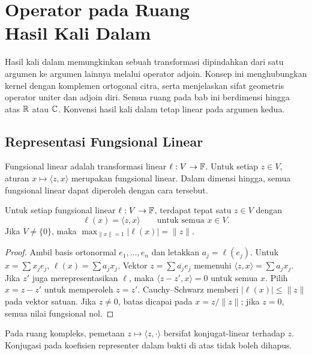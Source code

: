 \chapter[Operator pada Ruang Hasil Kali Dalam]{Operator pada Ruang\\Hasil Kali Dalam}
\label{ch:operator-hkd}

Hasil kali dalam memungkinkan sebuah transformasi dipindahkan
dari satu argumen ke argumen lainnya melalui operator adjoin.
Konsep ini menghubungkan kernel dengan komplemen ortogonal citra,
serta menjelaskan sifat geometris operator uniter dan adjoin diri.
Semua ruang pada bab ini berdimensi hingga atas $\mathbb{R}$ atau $\mathbb{C}$.
Konvensi hasil kali dalam tetap linear pada argumen kedua.

\section{Representasi Fungsional Linear}

Fungsional linear adalah transformasi linear $\ell:V\to\mathbb{F}$.
Untuk setiap $z\in V$, aturan $x\mapsto\langle z,x\rangle$
merupakan fungsional linear. Dalam dimensi hingga, semua
fungsional linear dapat diperoleh dengan cara tersebut.

\begin{teorema}
    Untuk setiap fungsional linear $\ell:V\to\mathbb{F}$, terdapat
    tepat satu $z\in V$ dengan
    \[
        \ell(x)=\langle z,x\rangle\qquad\text{untuk semua }x\in V.
    \]
    Jika $V\ne\{0\}$, maka
    $\max_{\|x\|=1}|\ell(x)|=\|z\|$.
\end{teorema}
\begin{proof}
    Ambil basis ortonormal $e_1,\ldots,e_n$ dan letakkan
    $a_j=\ell(e_j)$. Untuk $x=\sum x_je_j$,
    $\ell(x)=\sum a_jx_j$.
    Vektor $z=\sum\overline{a_j}e_j$ memenuhi
    $\langle z,x\rangle=\sum a_jx_j$.
    Jika $z'$ juga merepresentasikan $\ell$, maka
    $\langle z-z',x\rangle=0$ untuk semua $x$.
    Pilih $x=z-z'$ untuk memperoleh $z=z'$.
    Cauchy--Schwarz memberi $|\ell(x)|\le\|z\|$ pada vektor satuan.
    Jika $z\ne0$, batas dicapai pada $x=z/\|z\|$; jika $z=0$,
    semua nilai fungsional nol.
\end{proof}

Pada ruang kompleks, pemetaan $z\mapsto\langle z,\cdot\rangle$
bersifat konjugat-linear terhadap $z$. Konjugasi pada koefisien
representer dalam bukti di atas tidak boleh dihapus.

